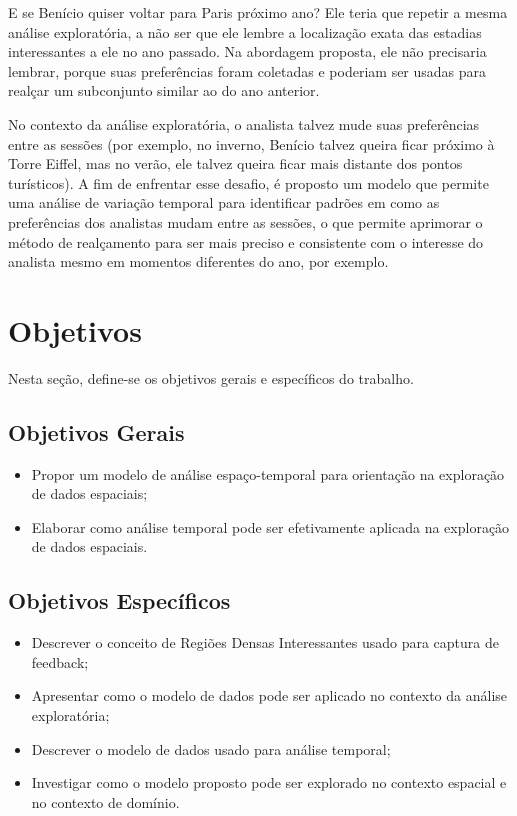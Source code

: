 E se Benício quiser voltar para Paris próximo ano? Ele teria que repetir a mesma análise exploratória, a não ser que ele lembre a localização exata das estadias interessantes a ele no ano passado. Na abordagem proposta, ele não precisaria lembrar, porque suas preferências foram coletadas e poderiam ser usadas para realçar um subconjunto similar ao do ano anterior.

No contexto da análise exploratória, o analista talvez mude suas preferências entre as sessões (por exemplo, no inverno, Benício talvez queira ficar próximo à Torre Eiffel, mas no verão, ele talvez queira ficar mais distante dos pontos turísticos). A fim de enfrentar esse desafio, é proposto um modelo que permite uma análise de variação temporal para identificar padrões em como as preferências dos analistas mudam entre as sessões, o que permite aprimorar o método de realçamento para ser mais preciso e consistente com o interesse do analista mesmo em momentos diferentes do ano, por exemplo.

\section{Objetivos}

Nesta seção, define-se os objetivos gerais e específicos do trabalho.

\subsection{Objetivos Gerais}

\begin{itemize}
	\item Propor um modelo de análise espaço-temporal para orientação na exploração de dados espaciais;
	\item Elaborar como análise temporal pode ser efetivamente aplicada na exploração de dados espaciais.
\end{itemize}

\subsection{Objetivos Específicos}

\begin{itemize}
	\item Descrever o conceito de Regiões Densas Interessantes usado para captura de feedback;
	\item Apresentar como o modelo de dados pode ser aplicado no contexto da análise exploratória;
	\item Descrever o modelo de dados usado para análise temporal;
	\item Investigar como o modelo proposto pode ser explorado no contexto espacial e no contexto de domínio.
\end{itemize}


